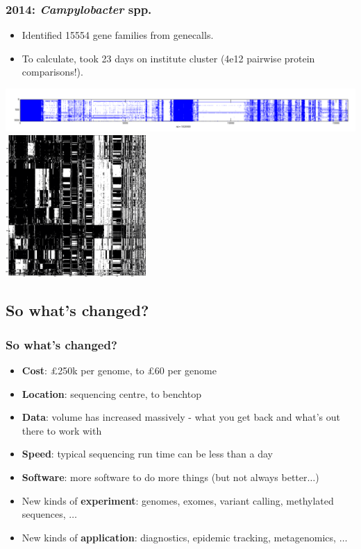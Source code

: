 \begin{frame}
  \frametitle{2014: \textit{Campylobacter} spp.}
  \begin{itemize}
    \item Identified 15554 gene families from genecalls.
    \item To calculate, took 23 days on institute cluster (4e12 pairwise protein comparisons!).  
  \end{itemize}      
  \begin{center}
    \includegraphics[width=1\textwidth]{images/Pres_abs_mat} \\
    \includegraphics[width=0.4\textwidth]{images/campy_presence_absence}    
  \end{center}        
\end{frame}

\subsection{So what's changed?}

\begin{frame}
  \frametitle{So what's changed?}
  \begin{itemize}
    \item \textbf{Cost}: \pounds250k per genome, to \pounds60 per genome
    \item \textbf{Location}: sequencing centre, to benchtop
    \item \textbf{Data}: volume has increased massively - what you get back and what's out there to work with
    \item \textbf{Speed}: typical sequencing run time can be less than a day
    \item \textbf{Software}: more software to do more things (but not always better$\ldots$)
    \item New kinds of \textbf{experiment}: genomes, exomes, variant calling, methylated sequences, $\ldots$
    \item New kinds of \textbf{application}: diagnostics, epidemic tracking, metagenomics, $\ldots$
  \end{itemize}       
\end{frame}